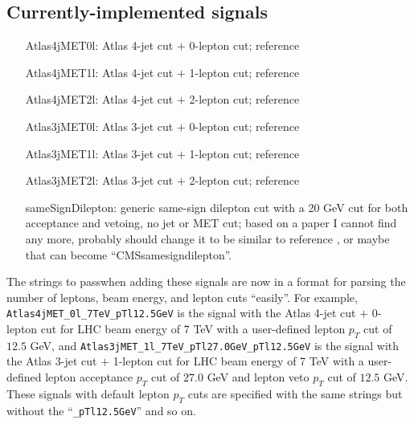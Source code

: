 \documentclass[10pt]{article}
\begin{document}
\subsection{Currently-implemented signals}
\label{subsec:currentSignals}

\begin{itemize}

\item[Atlas4jMET0l:] Atlas 4-jet cut $+$ 0-lepton cut;
                     reference \cite{ATLAS:1278474}

\item[Atlas4jMET1l:] Atlas 4-jet cut $+$ 1-lepton cut;
                     reference \cite{ATLAS:1278474}

\item[Atlas4jMET2l:] Atlas 4-jet cut $+$ 2-lepton cut;
                     reference \cite{ATLAS:1278474}

\item[Atlas3jMET0l:] Atlas 3-jet cut $+$ 0-lepton cut;
                     reference \cite{ATLAS:1278474}

\item[Atlas3jMET1l:] Atlas 3-jet cut $+$ 1-lepton cut;
                     reference \cite{ATLAS:1278474}

\item[Atlas3jMET2l:] Atlas 3-jet cut $+$ 2-lepton cut;
                     reference \cite{ATLAS:1278474}

\item[sameSignDilepton:] generic same-sign dilepton cut with a 20 GeV cut for
                         both acceptance and vetoing, no jet or MET cut;
                         based on a paper I cannot find any more, probably
                         should change it to be similar to reference
                         \cite{Chatrchyan:2011wba}, or maybe that can become
                         ``CMSsamesigndilepton''.

\end{itemize}

The strings to passwhen adding these signals are now in a format for parsing the
 number of leptons, beam energy, and lepton cuts ``easily''. For example,
 \texttt{Atlas4jMET\_0l\_7TeV\_pTl12.5GeV} is the signal with the Atlas 4-jet cut
 $+$ 0-lepton cut for LHC beam energy of 7 TeV with a user-defined lepton
 $p_{T}$ cut of $12.5$ GeV, and
 \texttt{Atlas3jMET\_1l\_7TeV\_pTl27.0GeV\_pTl12.5GeV} is the signal with the
 Atlas 3-jet cut $+$ 1-lepton cut for LHC beam energy of 7 TeV with a
 user-defined lepton acceptance $p_{T}$ cut of $27.0$ GeV and lepton veto
 $p_{T}$ cut of $12.5$ GeV. These signals with default lepton $p_{T}$ cuts are
 specified with the same strings but without the ``\texttt{\_pTl12.5GeV}'' and
 so on.
\end{document}
